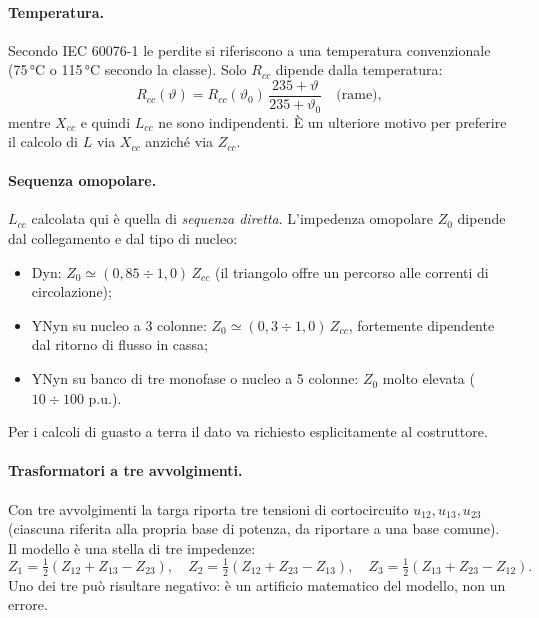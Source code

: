 \documentclass[11pt,a4paper]{article}
\begin{document}
\paragraph{Temperatura.} Secondo IEC 60076-1 le perdite si riferiscono a una temperatura
convenzionale (75\,°C o 115\,°C secondo la classe). Solo $R_{cc}$ dipende dalla
temperatura:
\begin{equation}
R_{cc}(\vartheta) = R_{cc}(\vartheta_0)\,\frac{235+\vartheta}{235+\vartheta_0}
\quad\text{(rame)},
\end{equation}
mentre $X_{cc}$ e quindi $L_{cc}$ ne sono indipendenti. È un ulteriore motivo per
preferire il calcolo di $L$ via $X_{cc}$ anziché via $Z_{cc}$.

\paragraph{Sequenza omopolare.} $L_{cc}$ calcolata qui è quella di \emph{sequenza
diretta}. L'impedenza omopolare $Z_0$ dipende dal collegamento e dal tipo di nucleo:
\begin{itemize}
  \item Dyn: $Z_0 \simeq (0{,}85\div1{,}0)\,Z_{cc}$ (il triangolo offre un percorso alle
        correnti di circolazione);
  \item YNyn su nucleo a 3 colonne: $Z_0 \simeq (0{,}3\div1{,}0)\,Z_{cc}$, fortemente
        dipendente dal ritorno di flusso in cassa;
  \item YNyn su banco di tre monofase o nucleo a 5 colonne: $Z_0$ molto elevata
        ($10\div100$ p.u.).
\end{itemize}
Per i calcoli di guasto a terra il dato va richiesto esplicitamente al costruttore.

\paragraph{Trasformatori a tre avvolgimenti.} Con tre avvolgimenti la targa riporta tre
tensioni di cortocircuito $u_{12}, u_{13}, u_{23}$ (ciascuna riferita alla propria base di
potenza, da riportare a una base comune). Il modello è una stella di tre impedenze:
\begin{equation}
Z_1 = \tfrac{1}{2}(Z_{12}+Z_{13}-Z_{23}),\quad
Z_2 = \tfrac{1}{2}(Z_{12}+Z_{23}-Z_{13}),\quad
Z_3 = \tfrac{1}{2}(Z_{13}+Z_{23}-Z_{12}).
\end{equation}
Uno dei tre può risultare negativo: è un artificio matematico del modello, non un errore.
\end{document}

